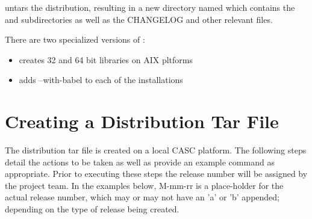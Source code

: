  untars the distribution, resulting in a new directory named 
 which contains the  and  subdirectories 
as well as the CHANGELOG and other relevant files.

There are two specialized versions of :
\begin{itemize}
\item {}   creates 32 and 64 bit libraries on AIX pltforms
\item {} adds --with-babel to each of the installations
\end{itemize}
   
\section{Creating a Distribution Tar File}
\label{Creating a Distribution Tar File}

The distribution tar file is created on a local CASC platform.  The following 
steps detail the actions to be taken as well as provide an example command as 
appropriate.  Prior to executing these steps the release number will be assigned 
by the project team. In the examples below, M-mm-rr is a place-holder for the 
actual release number, which may or may not have an 'a' or 'b' appended; depending 
on the type of release being created.

